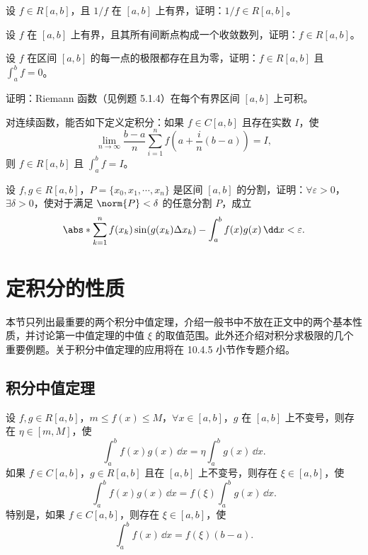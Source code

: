 \begin{xexercise}[7]
设 $f\in R[a,b]$，且 $1/f$ 在 $[a,b]$ 上有界，证明：$1/f\in R[a,b]$。
\end{xexercise}

\begin{xexercise}[8]
设 $f$ 在 $[a,b]$ 上有界，且其所有间断点构成一个收敛数列，证明：$f\in R[a,b]$。
\end{xexercise}

\begin{xexercise}[9]
设 $f$ 在区间 $[a,b]$ 的每一点的极限都存在且为零，证明：$f\in R[a,b]$ 且 $\int_a^b f=0$。
\end{xexercise}

\begin{xexercise}[10]
证明：Riemann 函数（见例题 5.1.4）在每个有界区间 $[a,b]$ 上可积。
\end{xexercise}

\begin{xexercise}[11]
对连续函数，能否如下定义定积分：如果 $f\in C[a,b]$ 且存在实数 $I$，使
\[
  \lim_{n\to\infty}\frac{b-a}{n}\sum_{i=1}^n f\left(a+\frac{i}{n}(b-a)\right)=I,
\]
则 $f\in R[a,b]$ 且 $\int_a^b f=I$。
\end{xexercise}

\begin{xexercise}[12]
设 $f,g\in R[a,b]$，$P=\{x_0,x_1,\cdots,x_n\}$ 是区间 $[a,b]$ 的分割，证明：$\forall\varepsilon>0$，$\exists\delta>0$，使对于满足 $\norm{P}<\delta$ 的任意分割 $P$，成立
\[
  \abs*{\sum_{k=1}^n f(x_k)\sin(g(x_k)\Delta x_k)-\int_a^b f(x)g(x)\,\dd x}<\varepsilon.
\]
\end{xexercise}

\section{定积分的性质}

本节只列出最重要的两个积分中值定理，介绍一般书中不放在正文中的两个基本性质，并讨论第一中值定理的中值 $\xi$ 的取值范围。此外还介绍对积分求极限的几个重要例题。关于积分中值定理的应用将在 10.4.5 小节作专题介绍。

\subsection{积分中值定理}

\begin{xtheorem}[10.2.1（积分第一中值定理）]
设 $f,g\in R[a,b]$，$m\leqslant f(x)\leqslant M$，$\forall x\in[a,b]$，$g$ 在 $[a,b]$ 上不变号，则存在 $\eta\in[m,M]$，使
\[
  \int_a^b f(x)g(x)\,\dd x=\eta\int_a^b g(x)\,\dd x.
\]
如果 $f\in C[a,b]$，$g\in R[a,b]$ 且在 $[a,b]$ 上不变号，则存在 $\xi\in[a,b]$，使
\begin{equation}
  \int_a^b f(x)g(x)\,\dd x=f(\xi)\int_a^b g(x)\,\dd x.
  \tag{10.2}
  \label{eq:10.2}
\end{equation}
特别是，如果 $f\in C[a,b]$，则存在 $\xi\in[a,b]$，使
\[
  \int_a^b f(x)\,\dd x=f(\xi)(b-a).
\]
\end{xtheorem}


